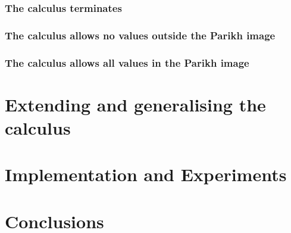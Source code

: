 \documentclass{easychair}
\theoremstyle{definition}
\newif\ifoutline
\newcommand{\contents}[1]{\ifoutline{\color{blue}
    \begin{itemize}
    #1
    \end{itemize}
  }\fi}
\begin{document}
\subsubsection{The calculus terminates}
\subsubsection{The calculus allows no values outside the Parikh image}
\subsubsection{The calculus allows all values in the Parikh image}

\section{Extending and generalising the calculus}

\section{Implementation and Experiments}

\contents{
\item length constraints
\item Parikh automata, automata with registers
\item Model-checking examples
}

\section{Conclusions}

\clearpage
%
\printbibliography
\end{document}
